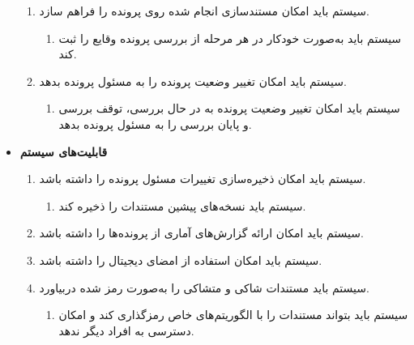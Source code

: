 \documentclass[12pt,a4paper,oneside]{article}
\begin{document}
\begin{itemize}
\begin{enumerate}
        \item 
        سیستم باید امکان مستندسازی انجام شده روی پرونده را فراهم سازد.
        \begin{enumerate}
            \renewcommand{\labelenumii}{\textbf{.R\arabic{enumi}.\arabic{enumii}}}
            \item 
            سیستم باید به‌صورت خودکار در هر مرحله از بررسی پرونده وقایع را ثبت کند.
        \end{enumerate}

        \item 
        سیستم باید امکان تغییر وضعیت پرونده را به مسئول پرونده بدهد.
        \begin{enumerate}
            \renewcommand{\labelenumii}{\textbf{.R\arabic{enumi}.\arabic{enumii}}}
            \item 
            سیستم باید امکان تغییر وضعیت پرونده به در حال بررسی، توقف بررسی و پایان بررسی را به مسئول پرونده بدهد.
        \end{enumerate}
    \end{enumerate}

    \item
    \textbf{قابلیت‌های سیستم}
    \begin{enumerate}
        \renewcommand{\labelenumi}{\textbf{.R\arabic{enumi}}}
        \setcounter{enumi}{46}

        \item 
        سیستم باید امکان ذخیره‌سازی تغییرات مسئول پرونده را داشته باشد.
        \begin{enumerate}
            \renewcommand{\labelenumii}{\textbf{.R\arabic{enumi}.\arabic{enumii}}}
            \item 
            سیستم باید نسخه‌های پیشین مستندات را ذخیره کند.
        \end{enumerate}

        \item 
        سیستم باید امکان ارائه گزارش‌های آماری از پرونده‌ها را داشته باشد.

        \item 
        سیستم باید امکان استفاده از امضای دیجیتال را داشته باشد.

        \item 
        سیستم باید مستندات شاکی و متشاکی را به‌صورت رمز شده دربیاورد.
        \begin{enumerate}
            \renewcommand{\labelenumii}{\textbf{.R\arabic{enumi}.\arabic{enumii}}}
            \item 
            سیستم باید بتواند مستندات را با الگوریتم‌های خاص رمزگذاری کند و امکان دسترسی به افراد دیگر ندهد.
        \end{enumerate}


\end{enumerate}
\end{itemize}
\end{document}
